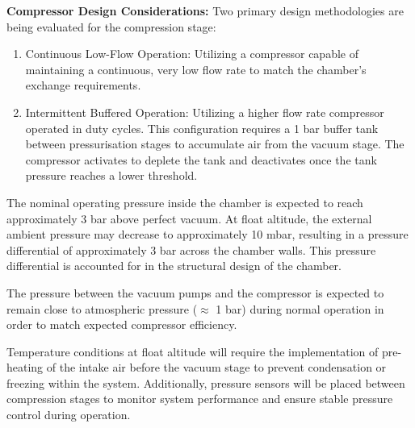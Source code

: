 \documentclass[
  a4paper,
  11pt,
  openany,
  parskip,
  toc=totoc,
  listof=totoc,
  bibliography=totoc
]{scrreprt}
\begin{document}

\textbf{Compressor Design Considerations:} Two primary design methodologies are being evaluated for the compression stage:

\begin{enumerate}
    \item Continuous Low-Flow Operation: Utilizing a compressor capable of maintaining a continuous, very low flow rate to match the chamber's exchange requirements.
    \item Intermittent Buffered Operation: Utilizing a higher flow rate compressor operated in duty cycles. This configuration requires a 1 bar buffer tank between pressurisation stages to accumulate air from the vacuum stage. The compressor activates to deplete the tank and deactivates once the tank pressure reaches a lower threshold.
\end{enumerate}

The nominal operating pressure inside the chamber is expected to reach approximately 3 bar above perfect vacuum. At float altitude, the external ambient pressure may decrease to approximately 10 mbar, resulting in a pressure differential of approximately 3 bar across the chamber walls. This pressure differential is accounted for in the structural design of the chamber.

The pressure between the vacuum pumps and the compressor is expected to remain close to atmospheric pressure ($\approx$ 1 bar) during normal operation in order to match expected compressor efficiency.

Temperature conditions at float altitude will require the implementation of pre-heating of the intake air before the vacuum stage to prevent condensation or freezing within the system. Additionally, pressure sensors will be placed between compression stages to monitor system performance and ensure stable pressure control during operation.


\end{document}
